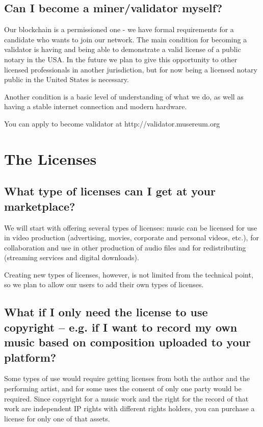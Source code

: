 \documentclass[12pt]{report}
\begin{document}
\section{Can I become a miner/validator myself?}
\label{blockchain-miner}
Our blockchain is a permissioned one - we have formal requirements for a candidate who wants to join our network. The main condition for becoming a validator is having and being able to demonstrate a valid license of a public notary in the USA. In the future we plan to give this opportunity to other licensed professionals in another jurisdiction, but for now being a licensed notary public in the United States is necessary.

Another condition is a basic level of understanding of what we do, as well as having a stable internet connection and modern hardware.

You can apply to become validator at http://validator.musereum.org

\chapter{The Licenses}
\label{licenses}

\section{What type of licenses can I get at your marketplace?}
\label{licenses-types}
We will start with offering several types of licenses: music can be
licensed for use in video production (advertising, movies, corporate
and personal videos, etc.), for collaboration and use in other
production of audio files and for redistributing (streaming services
and digital downloads).

Creating new types of licenses, however, is not limited from the
technical point, so we plan to allow our users to add their own types
of licenses.

\section{What if I only need the license to use copyright – e.g. if I want to record my own music based on composition uploaded to your platform?}
\label{licenses-mixing}
Some types of use would require getting licenses from both the
author and the performing artist, and for some uses the consent of
only one party would be required. Since copyright for a music work
and the right for the record of that work are independent IP rights
with different rights holders, you can purchase a license for only one
of that assets.
\end{document}
